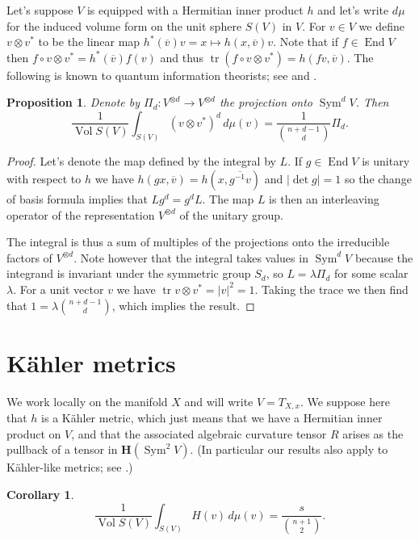 \documentclass[10pt,a4paper]{amsart}
\newtheorem{prop}[theo]{Proposition}
\newtheorem{coro}[theo]{Corollary}
\theoremstyle{definition}
\def\ov#1{\overline{#1}}
\def\d{\,d}
\def\herm{\mathbf{H}}
\DeclareMathOperator{\Sym}{Sym}
\DeclareMathOperator{\tr}{tr}
\DeclareMathOperator{\Vol}{Vol}
\DeclareMathOperator{\End}{End}
\begin{document}
Let's suppose $V$ is equipped with a Hermitian inner product $h$
and let's write $d\mu$ for the induced volume form on the unit sphere $S(V)$ in
$V$. For $v \in V$ we define $v \otimes v^*$ to be the linear map
$h^*(\ov v) v = x \mapsto h(x, \ov v) v$.
Note that if $f \in \End V$ then $f \circ v \otimes v^* = h^*(\ov v) f(v)$
and thus $\tr(f \circ v \otimes v^*) = h(fv, \ov v)$.
The following is known to quantum information theorists; see
\cite{harrow2013church}
and
\cite[Chapter~7]{watrous2018theory}.

\begin{prop}
\label{prop:projection}
Denote by $\Pi_d : V^{\otimes d} \to V^{\otimes d}$ the projection onto $\Sym^d V$.
Then
$$
\frac{1}{\Vol S(V)}
\int_{S(V)} (v \otimes v^*)^{d} \d\mu(v)
= \frac{1}{\binom{n+d-1}{d}} \Pi_d.
$$
\end{prop}

\begin{proof}
Let's denote the map defined by the integral by $L$. If $g \in \End V$ is
unitary with respect to $h$ we have $h(g x, \ov v) = h(x, \ov{g^{-1} v})$ and
$|\!\det g| = 1$ so the change of basis formula implies that $L g^d = g^d L$.
The map $L$ is then an interleaving operator of the representation $V^{\otimes d}$
of the unitary group.

The integral is thus a sum of multiples of the projections onto the irreducible
factors of $V^{\otimes d}$.
Note however that the integral takes values in $\Sym^d V$ because the integrand
is invariant under the symmetric group $S_d$, so $L = \lambda \Pi_d$ for some
scalar $\lambda$. For a unit vector $v$ we have $\tr v \otimes v^* = |v|^2 =
1$.
Taking the trace we then find that $1 = \lambda \binom{n+d-1}{d}$,
which implies the result.
\end{proof}


\section{K\"ahler metrics}

We work locally on the manifold $X$ and will write $V = T_{X,x}$.
We suppose here that $h$ is a K\"ahler metric, which just means that we have a
Hermitian inner product on $V$, and that the associated algebraic curvature
tensor $R$ arises as the pullback of a tensor in $\herm(\Sym^2 V)$.
(In particular our results also apply to K\"ahler-like metrics; see
\cite{yang2016curvature}.)

\begin{coro}
$$
\frac{1}{\Vol S(V)} \int_{S(V)}
\!\!\!
H(v)  \d\mu(v)
= \frac{s}{\binom{n+1}{2}}.
$$
\end{coro}
\end{document}
